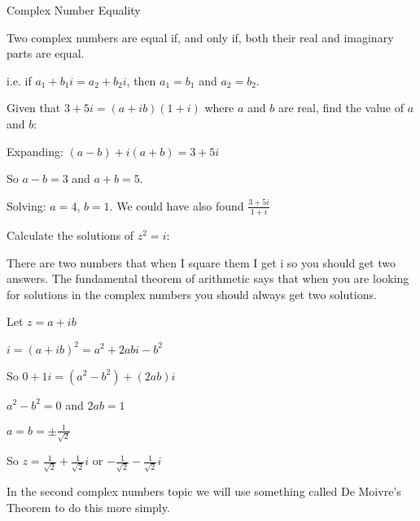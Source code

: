 \documentclass{beamer}
\begin{document}
	\begin{frame}[shrink=15]{Complex Number Equality}
	    \begin{definition}
	        Two complex numbers are equal if, and only if, both their real and imaginary parts are equal.
	        
	        i.e. if $a_1+b_1i = a_2+b_2i$, then $a_1=b_1$ and $a_2=b_2$.
	    \end{definition}
	    
	    \begin{problem}
	        Given that $3+5i=(a+ib)(1+i)$ where $a$ and $b$ are real, find the value of $a$ and $b$:
	    \end{problem}
	    
	    \begin{solution}
	        Expanding: $(a-b)+i(a+b)=3+5i$
	        
            So $a-b=3$ and $a+b=5$.
            
            Solving: $a=4$, $b=1$. We could have also found $\frac{3+5i}{1+i}$
	    \end{solution}
	    
	    \begin{problem}
	        Calculate the solutions of $z^2=i$:
	    \end{problem}
	    
        \alert<1>{There are two numbers that when I square them I get i so you should get two answers. The fundamental theorem of arithmetic says that when you are looking for solutions in the complex numbers you should always get two solutions.}
    
	    \begin{solution}
	        Let $z=a+ib$
	        
            $i=(a+ib)^2=a^2+2abi-b^2$
            
            So $0+1i=(a^2-b^2 )+(2ab)i $
            
            $a^2-b^2=0$ and $2ab=1$
            
            $a=b=\pm \frac{1}{\sqrt{2}}$
            
            So $z=\frac{1}{\sqrt{2}}+\frac{1}{\sqrt{2}}i$ or $-\frac{1}{\sqrt{2}}-\frac{1}{\sqrt{2}}i$
	    \end{solution}
	    
	    \alert<1>{In the second complex numbers topic we will use something called De Moivre’s Theorem to do this more simply.}
	\end{frame}
	
\end{document}
